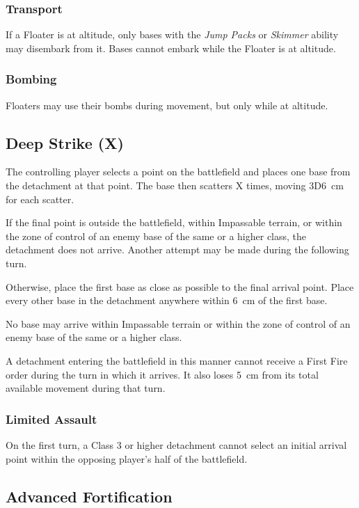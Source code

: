 \subsubsection{Transport}

If a Floater is at altitude, only bases with the \textit{Jump Packs} or \textit{Skimmer} ability may disembark from it. Bases cannot embark while the Floater is at altitude.

\subsubsection{Bombing}

Floaters may use their bombs during movement, but only while at altitude.

\subsection{Deep Strike (X)}

The controlling player selects a point on the battlefield and places one base from the detachment at that point. The base then scatters X times, moving 3D6~cm for each scatter.

If the final point is outside the battlefield, within Impassable terrain, or within the zone of control of an enemy base of the same or a higher class, the detachment does not arrive. Another attempt may be made during the following turn.

Otherwise, place the first base as close as possible to the final arrival point. Place every other base in the detachment anywhere within 6~cm of the first base.

No base may arrive within Impassable terrain or within the zone of control of an enemy base of the same or a higher class.

A detachment entering the battlefield in this manner cannot receive a First Fire order during the turn in which it arrives. It also loses 5~cm from its total available movement during that turn.

\subsubsection{Limited Assault}

On the first turn, a Class 3 or higher detachment cannot select an initial arrival point within the opposing player's half of the battlefield.

\subsection{Advanced Fortification}

